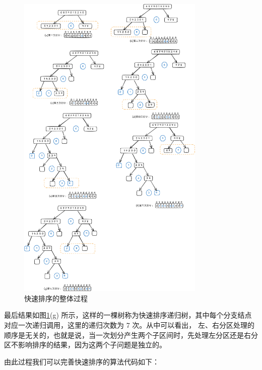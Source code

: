 \documentclass[lang=cn,newtx,10pt,scheme=chinese]{elegantbook}
\begin{document}
\begin{figure}[h!]
    \centering
    \includegraphics[width=0.8\textwidth]{./figure/pdf/cropped/quickSort.pdf}
    \caption{快速排序的整体过程}
    \label{fig:quickSort}
\end{figure}

最后结果如图\ref{fig:quickSort}(g) 所示，这样的一棵树称为快速排序递归树，其中每个分支结点对应一次递归调用，这里的递归次数为 7 次。从中可以看出，
左、右分区处理的顺序是无关的，也就是说，当一次划分产生两个子区间时，先处理左分区还是右分区不影响排序的结果，因为这两个子问题是独立的。


由此过程我们可以完善快速排序的算法代码如下：
\end{document}
